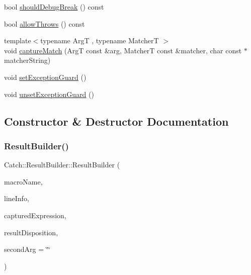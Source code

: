 \begin{DoxyCompactItemize}
\item 
bool \mbox{\hyperlink{class_catch_1_1_result_builder_a6f2b0dbcc6cc5e0a500ac45f2534e3e7}{should\+Debug\+Break}} () const
\item 
bool \mbox{\hyperlink{class_catch_1_1_result_builder_a0428fd78ab9e8e6f1aca6855f20fc715}{allow\+Throws}} () const
\item 
{\footnotesize template$<$typename ArgT , typename MatcherT $>$ }\\void \mbox{\hyperlink{class_catch_1_1_result_builder_a27425538bec8fee7ac69403c5df6078c}{capture\+Match}} (ArgT const \&arg, MatcherT const \&matcher, char const $\ast$matcher\+String)
\item 
void \mbox{\hyperlink{class_catch_1_1_result_builder_a87929808b4ec9b6cb5838edc1f27df17}{set\+Exception\+Guard}} ()
\item 
void \mbox{\hyperlink{class_catch_1_1_result_builder_a0990e93c1e13f96ffe02fa0f45e8f155}{unset\+Exception\+Guard}} ()
\end{DoxyCompactItemize}


\subsection{Constructor \& Destructor Documentation}
\mbox{\label{class_catch_1_1_result_builder_a8579c3056f64f9324cf1181532828376}} 
\subsubsection{\texorpdfstring{Result\+Builder()}{ResultBuilder()}}
{\footnotesize\ttfamily Catch\+::\+Result\+Builder\+::\+Result\+Builder (\begin{DoxyParamCaption}\item[{char const $\ast$}]{macro\+Name,  }\item[{\mbox{\hyperlink{struct_catch_1_1_source_line_info}{Source\+Line\+Info}} const \&}]{line\+Info,  }\item[{char const $\ast$}]{captured\+Expression,  }\item[{\mbox{\hyperlink{struct_catch_1_1_result_disposition_a3396cad6e2259af326b3aae93e23e9d8}{Result\+Disposition\+::\+Flags}}}]{result\+Disposition,  }\item[{char const $\ast$}]{second\+Arg = {\ttfamily \char`\"{}\char`\"{}} }\end{DoxyParamCaption})}

